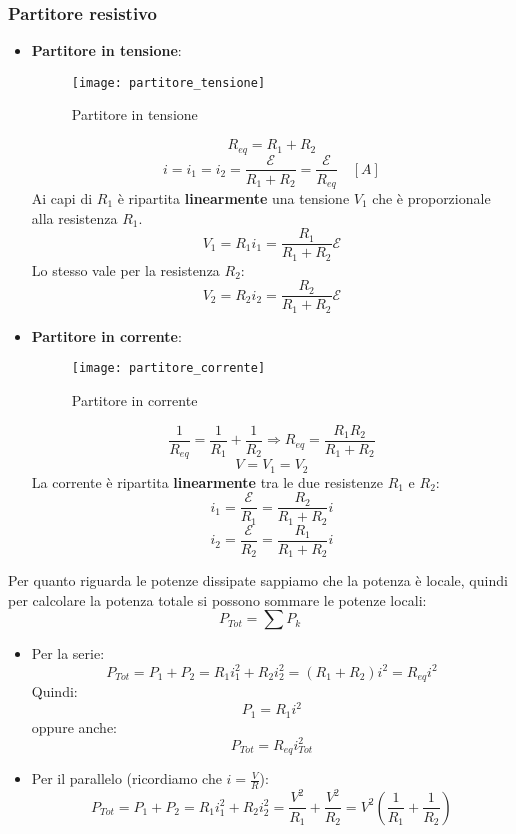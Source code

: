 \documentclass[a4paper]{article}
\begin{document}
\subsubsection{Partitore resistivo}
\begin{itemize}
  \item \textbf{Partitore in tensione}: 
    \begin{figure}[H]
      \centering
      \texttt{[image: partitore\_tensione]}
      \caption{Partitore in tensione}
    \end{figure}
    \[
      R_{eq} = R_1 + R_2
    \] 
    \[
      i = i_1 = i_2 = \frac{\mathcal{E}}{R_1 + R_2} = \frac{\mathcal{E}}{R_{eq}} \quad \left[ A \right]
    \] 
    Ai capi di \( R_1 \) è ripartita \textbf{linearmente} una tensione \( V_1 \) che è
    proporzionale alla resistenza \( R_1 \).
    \[
    V_1 = R_1 i_1 = \frac{R_1}{R_1 + R_2} \mathcal{E}
    \] 
    Lo stesso vale per la resistenza \( R_2 \):
    \[
      V_2 = R_2 i_2 = \frac{R_2}{R_1 + R_2} \mathcal{E}
    \] 

  \item \textbf{Partitore in corrente}:
    \begin{figure}[H]
      \centering
      \texttt{[image: partitore\_corrente]}
      \caption{Partitore in corrente}
    \end{figure}
    \[
      \frac{1}{R_{eq}} = \frac{1}{R_1} + \frac{1}{R_2} \Rightarrow R_{eq} = \frac{R_1R_2}{R_1 + R_2}
    \] 
    \[
      V = V_1 = V_2
    \] 
    La corrente è ripartita \textbf{linearmente} tra le due resistenze \( R_1 \) e \( R_2 \):
    \[
      i_1 = \frac{\mathcal{E}}{R_1} = \frac{R_2}{R_1+R_2} i
    \] 
    \[
      i_2 = \frac{\mathcal{E}}{R_2} = \frac{R_1}{R_1+R_2} i
    \]
\end{itemize}
Per quanto riguarda le potenze dissipate sappiamo che la potenza è locale, quindi per
calcolare la potenza totale si possono sommare le potenze locali:
\[
  P_{Tot} = \sum P_k
\] 
\begin{itemize}
  \item Per la serie:
    \[
      P_{Tot} = P_1 + P_2 = R_1 i_1^2 + R_2 i_2^2
      = (R_1 + R_2)i^2 = R_{eq} i^2
    \] 
    Quindi:
    \[
      P_1 = R_1 i^2
    \] 
    oppure anche:
    \[
      P_{Tot} = R_{eq} i_{Tot}^2
    \] 
  \item Per il parallelo (ricordiamo che \( i = \frac{V}{R} \)):
    \[
      P_{Tot} = P_1 + P_2 = R_1 i_1^2 + R_2 i_2^2
      = \frac{V^2}{R_1} + \frac{V^2}{R_2}
      = V^2 \left( \frac{1}{R_1} + \frac{1}{R_2} \right)
    \] 
\end{itemize}
\end{document}
